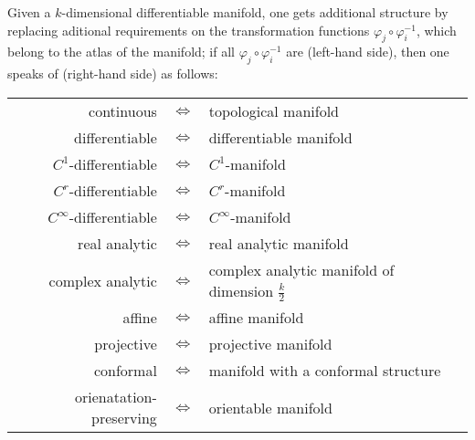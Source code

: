 \documentclass[../main.tex]{subfiles}
\begin{document}
\begin{definition}\label{SmoothManifold}
    Given a \(k\)-dimensional differentiable manifold,
    one gets additional structure
    by replacing aditional requirements on the transformation functions \(\varphi_j\circ\varphi_i^{-1}\),
    which belong to the atlas of the manifold;
    if all \(\varphi_j\circ\varphi_i^{-1}\) are (left-hand side),
    then one speaks of (right-hand side) as follows:
    \begin{center}
        \begin{tabular}{ r c l }
            continuous                  & \(\iff\) & topological manifold                                   \\
            differentiable              & \(\iff\) & differentiable manifold                                \\
            \(C^1\)-differentiable      & \(\iff\) & \(C^1\)-manifold                                       \\
            \(C^r\)-differentiable      & \(\iff\) & \(C^r\)-manifold                                       \\
            \(C^\infty\)-differentiable & \(\iff\) & \(C^\infty\)-manifold                                  \\
            real analytic               & \(\iff\) & real analytic manifold                                 \\
            complex analytic            & \(\iff\) & complex analytic manifold of dimension \(\frac{k}{2}\) \\
            affine                      & \(\iff\) & affine manifold                                        \\
            projective                  & \(\iff\) & projective manifold                                    \\
            conformal                   & \(\iff\) & manifold with a conformal structure                    \\
            orienatation-preserving     & \(\iff\) & orientable manifold                                    \\
        \end{tabular}
    \end{center}
\end{definition}
\end{document}
